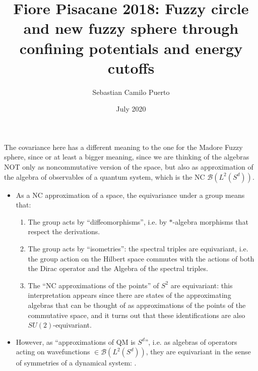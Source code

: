 \documentclass{article}
\title{Fiore Pisacane 2018: Fuzzy circle and new fuzzy sphere through confining potentials and energy cutoffs}
\author{Sebastian Camilo Puerto}
\date{July 2020}
\begin{document}
\maketitle

\tableofcontents

The covariance here has a different meaning to the one for the Madore Fuzzy sphere, since or at least a bigger meaning, since we are thinking of the algebras NOT only as noncommutative version of the space, but also as approximation of the algebra of observables of a quantum system, which is the NC $\mathcal B(L^2(S^d))$.
    \begin{itemize}
        
    \item As a NC approximation of a space, the equivariance under a group means that: 
    
        \begin{enumerate}
        
        \item The group acts by ``diffeomorphisms'', i.e. by $*$-algebra morphisms %
        that respect the derivations.
        
        \item The group acts by ``isometries'': the spectral triples are equivariant, i.e. the group action on the Hilbert space commutes with the actions of both the Dirac operator and the Algebra of the spectral triples.
        
        \item The ``NC approximations of the points'' of $S^2$ are equivariant: this interpretation appears since there are states of the approximating algebras that can be thought of as approximations of the points of the commutative space, and it turns out that these identifications are also $SU(2)$-equivariant.
        
        \end{enumerate}
    
    \item However, as ``approximations of QM is $S^d$'', i.e. as algebras of operators acting on wavefunctions $\in \mathcal B(L^2(S^d))$, they are equivariant in the sense of symmetries of a dynamical system: .
    

\end{itemize}
\end{document}
